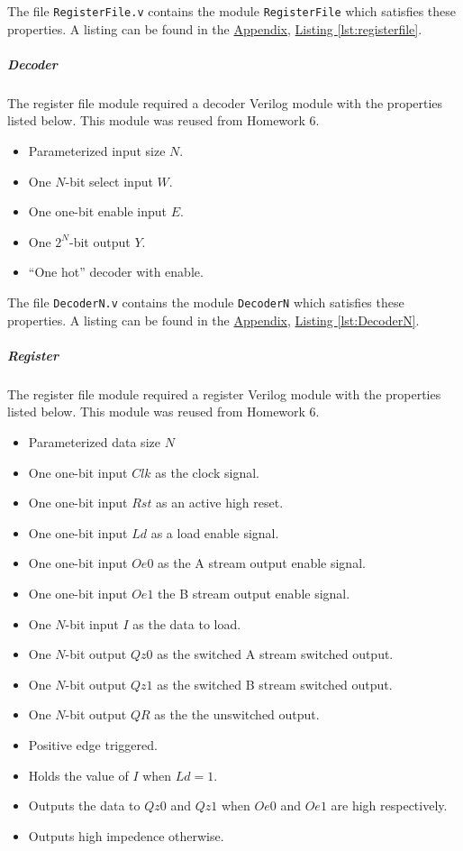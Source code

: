 The file \verb|RegisterFile.v| contains the module \verb|RegisterFile| which satisfies these properties.
A listing can be found in the \hyperref[sec:appendix]{Appendix}, \hyperref[lst:registerfile]{Listing \ref*{lst:registerfile}}.

\subparagraph{Decoder} \label{subpar:decoder}

The register file module required a decoder Verilog module with the properties listed below.
This module was reused from Homework 6.

\begin{itemize}
    \item Parameterized input size $N$.
    \item One $N$-bit select input $W$.
    \item One one-bit enable input $E$.
    \item One $2^N$-bit output $Y$.
    \item ``One hot'' decoder with enable.
\end{itemize}

The file \verb|DecoderN.v| contains the module \verb|DecoderN| which satisfies these properties.
A listing can be found in the \hyperref[sec:appendix]{Appendix}, \hyperref[lst:DecoderN]{Listing \ref*{lst:DecoderN}}.

\subparagraph{Register} \label{subpar:register}

The register file module required a register Verilog module with the properties listed below.
This module was reused from Homework 6.

\begin{itemize}
    \item Parameterized data size $N$
    \item One one-bit input $Clk$ as the clock signal.
    \item One one-bit input $Rst$ as an active high reset.
    \item One one-bit input $Ld$ as a load enable signal.
    \item One one-bit input $Oe0$ as the A stream output enable signal.
    \item One one-bit input $Oe1$ the B stream output enable signal.
    \item One $N$-bit input $I$ as the data to load.
    \item One $N$-bit output $Qz0$ as the switched A stream switched output.
    \item One $N$-bit output $Qz1$ as the switched B stream switched output.
    \item One $N$-bit output $QR$ as the the unswitched output. 
    \item Positive edge triggered.
    \item Holds the value of $I$ when $Ld = 1$.
    \item Outputs the data to $Qz0$ and $Qz1$ when $Oe0$ and $Oe1$ are high respectively.
    \item Outputs high impedence otherwise.
\end{itemize}

